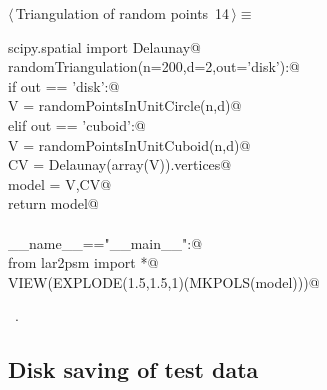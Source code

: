 \documentclass[11pt,oneside]{article}	%
\begin{document}
\begin{flushleft} \small \label{scrap25}
\protect{}$\langle\,$Triangulation of random points\nobreak\ {\footnotesize 14}$\,\rangle\equiv$
\vspace{-1ex}
\begin{list}{}{} \item
\mbox{}\verb@from scipy.spatial import Delaunay@\\
\mbox{}\verb@def randomTriangulation(n=200,d=2,out='disk'):@\\
\mbox{}\verb@   if out == 'disk':@\\
\mbox{}\verb@      V = randomPointsInUnitCircle(n,d)@\\
\mbox{}\verb@   elif out == 'cuboid':@\\
\mbox{}\verb@      V = randomPointsInUnitCuboid(n,d)@\\
\mbox{}\verb@   CV = Delaunay(array(V)).vertices@\\
\mbox{}\verb@   model = V,CV@\\
\mbox{}\verb@   return model@\\
\mbox{}\verb@@\\
\mbox{}\verb@if __name__=="__main__":@\\
\mbox{}\verb@   from lar2psm import *@\\
\mbox{}\verb@   VIEW(EXPLODE(1.5,1.5,1)(MKPOLS(model)))@\\
\mbox{}\verb@@{\NWsep}
\end{list}
\vspace{-1ex}
\footnotesize\addtolength{\baselineskip}{-1ex}
\begin{list}{}{\setlength{\itemsep}{-\parsep}\setlength{\itemindent}{-\leftmargin}}
\item \NWtxtMacroRefIn\ .
\end{list}
\end{flushleft}

\subsection{Disk saving of test data}
\end{document}
